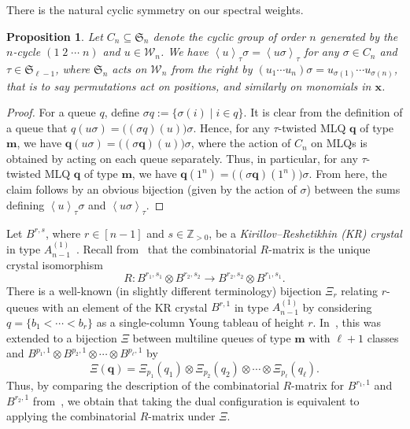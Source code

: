 \documentclass[reqno]{amsart}
\newcommand{\0}{\phantom{c}}
\newcommand{\swt}[1]{\left\langle #1 \right\rangle} %
\newcommand{\SymGp}[1]{\mathfrak{S}_{#1}} %
\newcommand{\mm}{\mathbf{m}}
\newcommand{\qq}{\mathbf{q}}
\newcommand{\xx}{\mathbf{x}}
\newcommand{\mcW}{\mathcal{W}}
\newcommand{\ZZ}{\mathbb{Z}}
\newcommand{\defn}[1]{{\color{darkred}\emph{#1}}} %
\theoremstyle{plain}
\newtheorem{prop}[thm]{Proposition}
\theoremstyle{definition}
\numberwithin{equation}{section}
\begin{document}
There is the natural cyclic symmetry on our spectral weights.

\begin{prop}
  Let $C_n \subseteq \SymGp{n}$ denote the cyclic group of order $n$ generated by the $n$-cycle $(1 \; 2 \; \dotsm \; n)$ and $u \in \mcW_n$.
  We have $\swt{u}_{\tau}\sigma = \swt{u \sigma}_{\tau}$ for any $\sigma \in C_n$ and $\tau \in \SymGp{\ell-1}$, where $\SymGp{n}$ acts on $\mcW_n$ from the right by $(u_1 \dotsm u_n) \sigma = u_{\sigma(1)} \dotsm u_{\sigma(n)}$, that is to say permutations act on positions, and similarly on monomials in $\xx$.
\end{prop}

\begin{proof}
  For a queue $q$, define $\sigma q := \{ \sigma(i) \mid i \in q\}$.
  It is clear from the definition of a queue that $q(u \sigma) = \bigl( (\sigma q)(u) \bigr) \sigma$.
  Hence, for any $\tau$-twisted MLQ $\qq$ of type $\mm$, we have
  $\qq (u \sigma) = \bigl( (\sigma \qq)(u) \bigr) \sigma$,
  where the action of $C_n$ on MLQs is obtained by acting on each queue separately.
  Thus, in particular, for any $\tau$-twisted MLQ $\qq$ of type $\mm$, we have
  $\qq (1^n) = \bigl( (\sigma \qq)(1^n) \bigr) \sigma$.
  From here, the claim follows by an obvious bijection
  (given by the action of $\sigma$) between the sums defining
  $\swt{u}_{\tau} \sigma$ and $\swt{u \sigma}_{\tau}$.
\end{proof}

Let $B^{r,s}$, where $r \in [n-1]$ and $s \in \ZZ_{>0}$, be a \defn{Kirillov--Reshetikhin (KR) crystal} in type $A_{n-1}^{(1)}$~\cite{KKMMNN92}.
Recall from~\cite{NY97,Shimozono02} that the combinatorial $R$-matrix is the unique crystal isomorphism
\[
R \colon B^{r_1,s_1} \otimes B^{r_2,s_2} \to B^{r_2,s_2} \otimes B^{r_1,s_1}.
\]
There is a well-known (in slightly different terminology) bijection $\Xi_r$ relating $r$-queues with an element of the KR crystal $B^{r,1}$ in type $A_{n-1}^{(1)}$ by considering $q = \{b_1 < \cdots < b_r\}$  as a single-column Young tableau of height $r$.
In~\cite{KMO15}, this was extended to a bijection $\Xi$ between multiline queues of type $\mm$ with $\ell+1$ classes and $B^{p_1,1} \otimes B^{p_2,1} \otimes \dotsm \otimes B^{p_{\ell},1}$ by
\[
\Xi(\qq) = \Xi_{p_1}(q_1) \otimes \Xi_{p_2}(q_2) \otimes \dotsm \otimes \Xi_{p_{\ell}}(q_{\ell}).
\]
Thus, by comparing the description of the combinatorial $R$-matrix for $B^{r_1,1}$ and $B^{r_2,1}$ from~\cite{NY97}, we obtain that taking the dual configuration is equivalent to applying the combinatorial $R$-matrix under $\Xi$.
\end{document}

